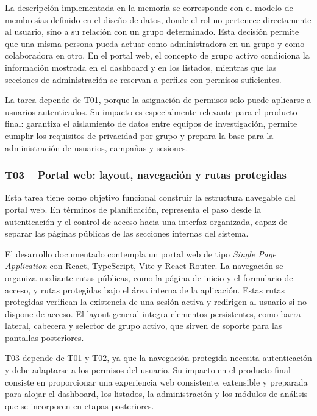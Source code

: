 La descripción implementada en la memoria se corresponde con el modelo de
membresías definido en el diseño de datos, donde el rol no pertenece directamente
al usuario, sino a su relación con un grupo determinado. Esta decisión permite que
una misma persona pueda actuar como administradora en un grupo y como colaboradora
en otro. En el portal web, el concepto de grupo activo condiciona la información
mostrada en el dashboard y en los listados, mientras que las secciones de
administración se reservan a perfiles con permisos suficientes.

La tarea depende de T01, porque la asignación de permisos solo puede aplicarse a
usuarios autenticados. Su impacto es especialmente relevante para el producto final:
garantiza el aislamiento de datos entre equipos de investigación, permite cumplir
los requisitos de privacidad por grupo y prepara la base para la administración de
usuarios, campañas y sesiones.

\subsubsection{T03 -- Portal web: layout, navegación y rutas protegidas}

Esta tarea tiene como objetivo funcional construir la estructura navegable del
portal web. En términos de planificación, representa el paso desde la autenticación
y el control de acceso hacia una interfaz organizada, capaz de separar las páginas
públicas de las secciones internas del sistema.

El desarrollo documentado contempla un portal web de tipo \textit{Single Page
Application} con React, TypeScript, Vite y React Router. La navegación se organiza
mediante rutas públicas, como la página de inicio y el formulario de acceso, y rutas
protegidas bajo el área interna de la aplicación. Estas rutas protegidas verifican
la existencia de una sesión activa y redirigen al usuario si no dispone de acceso.
El layout general integra elementos persistentes, como barra lateral, cabecera y
selector de grupo activo, que sirven de soporte para las pantallas posteriores.

T03 depende de T01 y T02, ya que la navegación protegida necesita autenticación y
debe adaptarse a los permisos del usuario. Su impacto en el producto final consiste
en proporcionar una experiencia web consistente, extensible y preparada para alojar
el dashboard, los listados, la administración y los módulos de análisis que se
incorporen en etapas posteriores.

